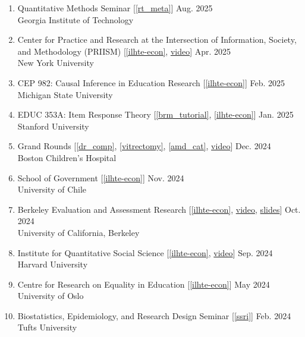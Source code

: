 \documentclass[11pt]{article}
\begin{document}
\begin{enumerate}
Multiple Universities
    \item Quantitative Methods Seminar [\ref{rt_meta}] \hfill Aug. 2025 \\
    Georgia Institute of Technology
    \item Center for Practice and Research at the Intersection of Information, Society, and Methodology (PRIISM) [\ref{ilhte-econ}, \href{https://www.youtube.com/watch?v=Khq4cd5z1nw&pp=0gcJCXcA-SJGOe9V}{video}] \hfill Apr. 2025 \\
    New York University
    \item CEP 982: Causal Inference in Education Research [\ref{ilhte-econ}] \hfill Feb. 2025 \\ Michigan State University
    \item  EDUC 353A: Item Response Theory [\ref{brm_tutorial}, \ref{ilhte-econ}] \hfill Jan. 2025 \\
    Stanford University
    \item Grand Rounds [\ref{dr_comp}, \ref{vitrectomy}, \ref{amd_cat}, \href{https://www.youtube.com/watch?v=PeW9XygJaPY}{video}] \hfill Dec. 2024 \\
    Boston Children's Hospital
   \item School of Government [\ref{ilhte-econ}] \hfill Nov. 2024 \\
    University of Chile
    \item Berkeley Evaluation and Assessment Research [\ref{ilhte-econ}, \href{https://files.bearcenter.org/video/JGilbert_EstimatingHeterogeneousEffects_20241029.mp4}{video}, \href{https://files.bearcenter.org/papers/slides_20241029_JGilbert_EstimatingHeterogenousEffects.pdf}{slides}] \hfill Oct. 2024 \\
    University of California, Berkeley
    \item Institute for Quantitative Social Science [\ref{ilhte-econ}, \href{https://harvard.zoom.us/rec/play/lXkb7LzH6lPiAdDokPMkQgOoQKTp1T_vKTVKF81Zq1YoqS2eZ5B07lcC_elrFwHdt0Ii4xjGzHlxSBPq.4gvKyj7v5FZ0xcpi?canPlayFromShare=true&from=share_recording_detail&continueMode=true&componentName=rec-play&originRequestUrl=https%3A%2F%2Fharvard.zoom.us%2Frec%2Fshare%2FSCCxcknu75ClTBb4YZ5hVT3udEcO9YSyJNwGY9WdN_qg__Y7SppGMISwelujaoAt.bT--j12-GLBaCWJG}{video}] \hfill Sep. 2024 \\
    Harvard University 
    \item Centre for Research on Equality in Education [\ref{ilhte-econ}] \hfill May 2024 \\
    University of Oslo
    \item Biostatistics, Epidemiology, and Research Design Seminar [\ref{ssri}] \hfill Feb. 2024 \\
    Tufts University


\end{enumerate}
\end{document}
